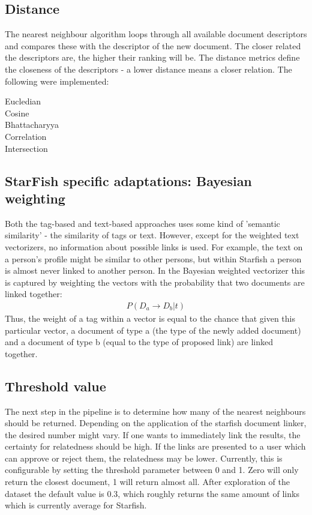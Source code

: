 \subsection{Distance}
The nearest neighbour algorithm loops through all available document descriptors and compares these with the descriptor of the new document. The closer related the descriptors are, the higher their ranking will be. The distance metrics define the closeness of the descriptors - a lower distance means a closer relation. The following were implemented:

\begin{description}
\item[Eucledian]
\item[Cosine]
\item[Bhattacharyya]
\item[Correlation]
\item[Intersection]
\end{description}

\subsection{StarFish specific adaptations: Bayesian weighting}
Both the tag-based and text-based approaches uses some kind of 'semantic similarity' - the similarity of tags or text. However, except for the weighted text vectorizers, no information about possible links is used. For example, the text on a person's profile might be similar to other persons, but within Starfish a person is almost never linked to another person. In the Bayesian weighted vectorizer this is captured by weighting the vectors with the probability that two documents are linked together:
\begin{align}
\nonumber P(D_a \rightarrow D_b | t)
\end{align}
Thus, the weight of a tag within a vector is equal to the chance that given this particular vector, a document of type a (the type of the newly added document) and a document of type b (equal to the type of proposed link) are linked together.

\subsection{Threshold value}
The next step in the pipeline is to determine how many of the nearest neighbours should be returned. Depending on the application of the starfish document linker, the desired number might vary. If one wants to immediately link the results, the certainty for relatedness should be high. If the links are presented to a user which can approve or reject them, the relatedness may be lower. Currently, this is configurable by setting the threshold parameter between 0 and 1. Zero will only return the closest document, 1 will return almost all. After exploration of the dataset the default value is 0.3, which roughly returns the same amount of links which is currently average for Starfish.

